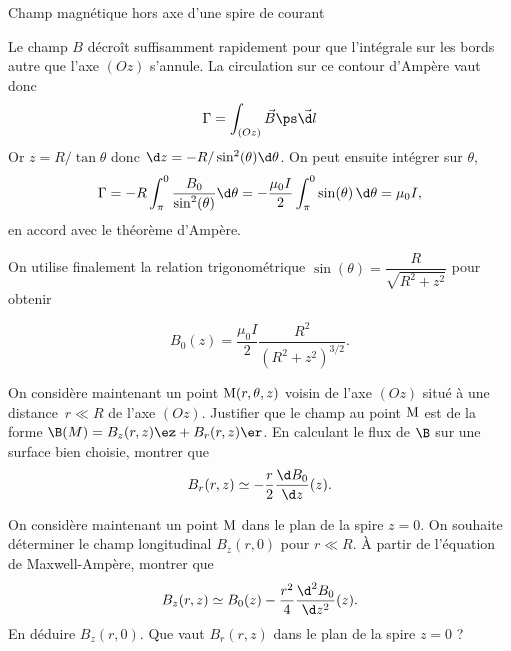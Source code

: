 \begin{exo}[PC][3][TD]{Champ magnétique hors axe d'une spire de courant}
\begin{quest}
{Le champ $B$ décroît suffisamment rapidement pour que l'intégrale sur les bords autre que l'axe $(Oz)$ s'annule.
La circulation sur ce contour d'Ampère vaut donc
$$\Gamma = \int_{(Oz)} \Vec{B}\ps \vec{\d l}$$
Or $z=R/\tan \theta$ donc  $\d z = -R/\sin^2(\theta) \d \theta$. On peut ensuite intégrer sur $\theta$,
$$ \Gamma = -R \int_\pi^0 \dfrac{B_0}{\sin^2(\theta)} \d \theta = -\dfrac{\mu_0 I}{2}\int_\pi^0 \sin(\theta)\,\d \theta = \mu_0 I,$$
en accord avec le théorème d'Ampère.

On utilise finalement la relation trigonométrique $\sin(\theta) = \dfrac{R}{\sqrt{R^2+z^2}}$ pour obtenir

$$B_0(z) = \dfrac{\mu_0 I}{2} \dfrac{R^2}{(R^2+z^2)^{3/2}}.$$
	 }

	\item On considère maintenant un point ${\rm M}(r,\theta,z)$ voisin de l'axe $(Oz)$ situé à une distance~$r\ll R$ de l'axe $(Oz)$. Justifier que le champ au point $\rm M$ est de la forme
	$\B(M) = B_z(r,z) \ez + B_r(r,z) \er$.
En calculant le flux de $\B$ sur une surface bien choisie, montrer que %
\begin{equation}
B_r(r,z) \simeq - \dfrac{r}{2}\dfrac{\d B_0}{\d z}(z).
\end{equation}


	\item On considère maintenant un point $\rm M$ dans le plan de la spire $z=0$. On souhaite déterminer le champ longitudinal $B_z(r,0)$ pour $r\ll R$. À partir de l'équation de Maxwell-Ampère, montrer que
	\begin{equation}
	B_z(r,z) \simeq B_0(z) - \dfrac{r^2}{4} \dfrac{\d^2 B_0}{\d z^2}(z).
	\end{equation}
	En déduire $B_z(r,0)$. Que vaut $B_r(r,z)$ dans le plan de la spire $z=0$ ?


\end{quest}
\end{exo}
